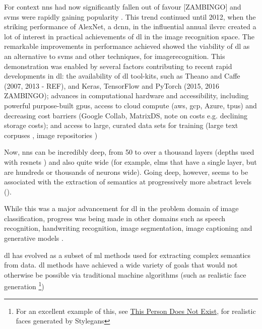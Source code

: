 For context \gls{nn}s had now significantly fallen out of favour [ZAMBINGO] and \gls{svm}s were rapidly gaining popularity \cite{svm_nn_comparison}. This trend continued until 2012, when the striking performance of AlexNet, a \gls{dcnn}, in the influential annual \gls{ilsvrc} created a lot of interest in practical achievements of \gls{dl} in the image recognition space. The remarkable improvements in performance achieved showed the viability of \gls{dl} as an alternative to \gls{svm}s and other techniques, for \gls{imagerecognition}. This demonstration was enabled by several factors contributing to recent rapid developments in \gls{dl}: the availability of \gls{dl} tool-kits, such as Theano and Caffe (2007, 2013 - REF), and Keras, TensorFlow and PyTorch (2015, 2016 ZAMBINGO); advances in computational hardware and accessibility, including powerful purpose-built \gls{gpu}s, access to cloud compute (\gls{aws}, \gls{gcp}, Azure, \gls{tpu}s) and decreasing cost barriers (Google Collab, MatrixDS, note on costs e.g. declining storage costs); and access to large, curated data sets for training (large text corpuses \cite{enron_emails}, image repositories \cite{image_net}) \bigskip

Now, \gls{nn}s can be incredibly deep, from 50 to over a thousand layers (depths used with \gls{resnet}s \cite{resnet}) and also quite wide (for example, \gls{elm}s that have a single layer, but are hundreds or thousands of neurons wide). Going deep, however, seems to be associated with the extraction of semantics at progressively more abstract levels (\cite{cnn_semantics}). 
\bigskip


While this was a major advancement for \gls{dl} in the problem domain of image classification, progress was being made in other domains such as speech recognition, handwriting recognition, image segmentation, image captioning and generative models \cite{dl_overview}. 
\bigskip %
 
\gls{dl} has evolved as a subset of \gls{ml} methods used for extracting complex semantics from data. \gls{dl} methods have achieved a wide variety of goals that would not otherwise be possible via traditional machine algorithms (such as realistic face generation \footnote{For an excellent example of this, see \href{https://www.thispersondoesnotexist.com/}{This Person Does Not Exist}, for realistic faces generated by Style\gls{gan}s})  \bigskip


